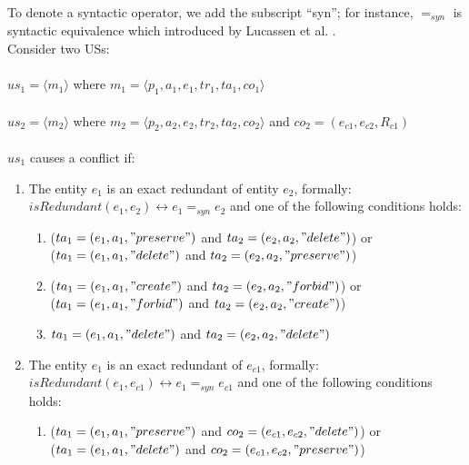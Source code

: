 \begin{definition}
\begin{itemize}
	\end{itemize}
	To denote a syntactic operator, we add the subscript
	“syn”; for instance, $=_{syn}$ is syntactic equivalence which introduced by Lucassen et al. \cite{lucassen2016improving}.\\ Consider two USs:\\\\ $us_1 = \langle m_1\rangle $ where $m_1 = \langle p_1,a_1,e_1,tr_1,ta_1,co_1 \rangle$ \\\\$us_2 = \langle m_2\rangle$ where $m_2 = \langle p_2,a_2,e_2,tr_2,ta_2,co_2 \rangle$ and $co_2 = (e_{c1},e_{c2},R_{c1})$\\\\
	$us_1$ causes a conflict if:
	\begin{enumerate}
		\item The entity $e_1$ is an exact redundant of entity $e_2$, formally:\\ $isRedundant(e_1,e_2) \leftrightarrow e_1 =_{syn} e_2$ and one of the following conditions holds:\\
		\begin{enumerate}
			\item ($ta_1 = (e_1,a_1,"preserve")$ and $ta_2 = (e_2,a_2,"delete")$) or \\($ta_1=(e_1,a_1,"delete")$ and $ta_2 = (e_2,a_2,"preserve")$)\\
			
			\item ($ta_1 = (e_1,a_1,"create")$ and $ta_2 = (e_2,a_2,"forbid")$) or \\($ta_1 = (e_1,a_1,"forbid")$ and $ta_2 = (e_2,a_2,"create")$)\\
			
			\item $ta_1 = (e_1,a_1,"delete")$ and $ta_2 = (e_2,a_2,"delete")$
		\end{enumerate}
		
		\item The entity $e_1$ is an exact redundant of  $e_{c1}$, formally:\\ $isRedundant(e_1,e_{c1}) \leftrightarrow e_1 =_{syn} e_{c1}$ and one of the following conditions holds:\\
		\begin{enumerate}
			\item ($ta_1 = (e_1,a_1,"preserve")$ and $co_2 = (e_{c1},e_{c2},"delete")$) or \\($ta_1 = (e_1,a_1,"delete")$ and $co_2 = (e_{c1},e_{c2},"preserve")$)\\
			

\end{enumerate}
\end{enumerate}
\end{definition}
